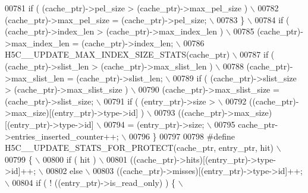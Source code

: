 \begin{DoxyCode}
00781 \textcolor{preprocessor}{        if ( (cache\_ptr)->pel\_size > (cache\_ptr)->max\_pel\_size )     \(\backslash\)}
00782 \textcolor{preprocessor}{            (cache\_ptr)->max\_pel\_size = (cache\_ptr)->pel\_size;       \(\backslash\)}
00783 \textcolor{preprocessor}{    \}                                                                \(\backslash\)}
00784 \textcolor{preprocessor}{    if ( (cache\_ptr)->index\_len > (cache\_ptr)->max\_index\_len )       \(\backslash\)}
00785 \textcolor{preprocessor}{        (cache\_ptr)->max\_index\_len = (cache\_ptr)->index\_len;         \(\backslash\)}
00786 \textcolor{preprocessor}{    H5C\_\_UPDATE\_MAX\_INDEX\_SIZE\_STATS(cache\_ptr)                      \(\backslash\)}
00787 \textcolor{preprocessor}{    if ( (cache\_ptr)->slist\_len > (cache\_ptr)->max\_slist\_len )       \(\backslash\)}
00788 \textcolor{preprocessor}{        (cache\_ptr)->max\_slist\_len = (cache\_ptr)->slist\_len;         \(\backslash\)}
00789 \textcolor{preprocessor}{    if ( (cache\_ptr)->slist\_size > (cache\_ptr)->max\_slist\_size )     \(\backslash\)}
00790 \textcolor{preprocessor}{        (cache\_ptr)->max\_slist\_size = (cache\_ptr)->slist\_size;       \(\backslash\)}
00791 \textcolor{preprocessor}{    if ( (entry\_ptr)->size >                                         \(\backslash\)}
00792 \textcolor{preprocessor}{            ((cache\_ptr)->max\_size)[(entry\_ptr)->type->id] )         \(\backslash\)}
00793 \textcolor{preprocessor}{        ((cache\_ptr)->max\_size)[(entry\_ptr)->type->id]               \(\backslash\)}
00794 \textcolor{preprocessor}{             = (entry\_ptr)->size;                                    \(\backslash\)}
00795 \textcolor{preprocessor}{    cache\_ptr->entries\_inserted\_counter++;                           \(\backslash\)}
00796 \textcolor{preprocessor}{\}}
00797 
00798 \textcolor{preprocessor}{#define H5C\_\_UPDATE\_STATS\_FOR\_PROTECT(cache\_ptr, entry\_ptr, hit)            \(\backslash\)}
00799 \textcolor{preprocessor}{\{                                                                           \(\backslash\)}
00800 \textcolor{preprocessor}{    if ( hit )                                                              \(\backslash\)}
00801 \textcolor{preprocessor}{        ((cache\_ptr)->hits)[(entry\_ptr)->type->id]++;                       \(\backslash\)}
00802 \textcolor{preprocessor}{    else                                                                    \(\backslash\)}
00803 \textcolor{preprocessor}{        ((cache\_ptr)->misses)[(entry\_ptr)->type->id]++;                     \(\backslash\)}
00804 \textcolor{preprocessor}{    if ( ! ((entry\_ptr)->is\_read\_only) ) \{                                  \(\backslash\)}

\end{DoxyCode}
